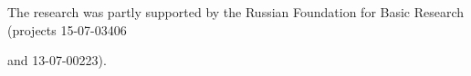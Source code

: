 












\Ack


\noindent


The research was partly supported by the Russian Foundation for Basic Research (projects 15-07-03406


 and 13-07-00223).













